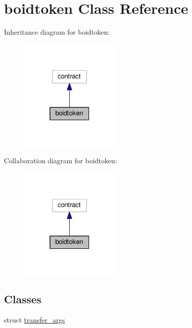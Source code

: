 \hypertarget{classboidtoken}{}\section{boidtoken Class Reference}
\label{classboidtoken}


Inheritance diagram for boidtoken\+:
\nopagebreak
\begin{figure}[H]
\begin{center}
\leavevmode
\includegraphics[width=139pt]{classboidtoken__inherit__graph}
\end{center}
\end{figure}


Collaboration diagram for boidtoken\+:
\nopagebreak
\begin{figure}[H]
\begin{center}
\leavevmode
\includegraphics[width=139pt]{classboidtoken__coll__graph}
\end{center}
\end{figure}
\subsection*{Classes}
\begin{DoxyCompactItemize}
\item 
struct \hyperlink{structboidtoken_1_1transfer__args}{transfer\+\_\+args}
\end{DoxyCompactItemize}

